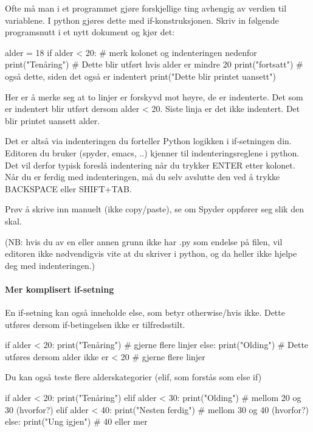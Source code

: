 {Ofte må man i et programmet gjøre forskjellige ting avhengig av verdien til variablene. I python gjøres dette med if-konstruksjonen. Skriv in følgende programsnutt i et nytt dokument og kjør det: 

\begin{usncodebox}
alder = 18
if alder < 20:            # merk kolonet og indenteringen nedenfor
   print("Tenåring")      # Dette blir utført hvis alder er mindre 20
   print("fortsatt")      # også dette, siden det også er indentert
print("Dette blir printet uansett")
\end{usncodebox}

Her er å merke seg at to linjer er forskyvd mot høyre, de er indenterte. Det som er indentert blir utført dersom alder < 20. Siste linja er det ikke indentert. Det blir printet uansett alder.

Det er altså via indenteringen du forteller Python logikken i if-setningen din. Editoren du bruker (spyder, emacs, ..) kjenner til indenteringsreglene i python. Det vil derfor typisk foreslå indentering når du trykker ENTER etter kolonet. Når du er ferdig med indenteringen, må du selv avslutte den ved å trykke BACKSPACE eller SHIFT+TAB. 

Prøv å skrive inn manuelt (ikke copy/paste), se om Spyder oppfører seg slik den skal. 

(NB: hvis du av en eller annen grunn ikke har .py som endelse på filen, vil editoren ikke nødvendigvis vite at du skriver i python, og da heller ikke hjelpe deg med indenteringen.) 

\paragraph{Mer komplisert if-setning}
En if-setning kan også inneholde else, som betyr otherwise/hvis ikke. Dette utføres dersom if-betingelsen ikke er tilfredsstilt. 

\begin{usncodebox}
if alder < 20: 
   print("Tenåring")
   # gjerne flere linjer
else: 
   print("Olding")     # Dette utføres dersom alder ikke er < 20
   # gjerne flere linjer
\end{usncodebox}

Du kan også teste flere alderskategorier (elif, som forstås som else if) 

\begin{usncodebox}
if alder < 20: 
   print("Tenåring")
elif alder < 30:           
   print("Olding")         # mellom 20 og 30 (hvorfor?) 
elif alder < 40: 
   print("Nesten ferdig")  # mellom 30 og 40 (hvorfor?)
else: 
   print("Ung igjen")  # 40 eller mer 
\end{usncodebox}

}
